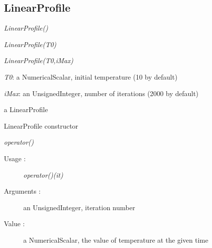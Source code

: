 \subsection{LinearProfile}
\begin{description}

\item[Usage:] \rule{0pt}{1em}
  \begin{description}
  \item \textit{LinearProfile()}
  \item \textit{LinearProfile(T0)}
  \item \textit{LinearProfile(T0,iMax)}
  \end{description}

\item[Arguments:]  \rule{0pt}{1em}
  \begin{description}
  \item \textit{T0}: a NumericalScalar, initial temperature (10 by default)
  \item \textit{iMax}: an UnsignedInteger, number of iterations (2000 by default)
  \end{description}

\item[Value :] a LinearProfile

\item[Details :]  \rule{0pt}{1em}
  \begin{description}
  \item LinearProfile constructor
  \end{description}

\item \textit{operator()}
  \begin{description}
  \item[Usage :] \textit{operator()(it)}
  \item[Arguments :] an UnsignedInteger, iteration number
  \item[Value :] a NumericalScalar, the value of temperature at the given time
  \end{description}

\end{description}

